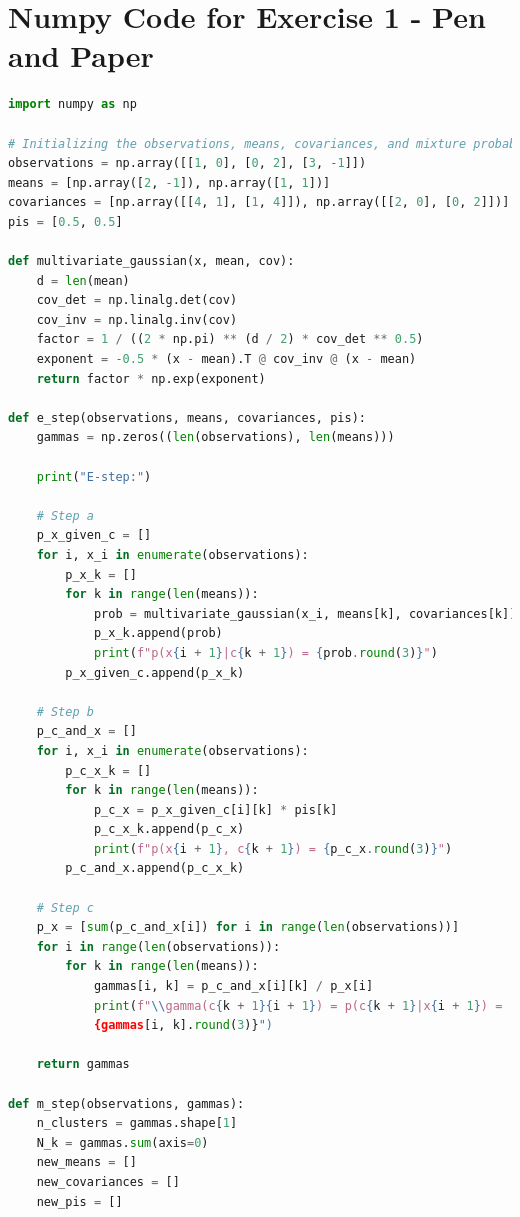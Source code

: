 \documentclass[12pt]{article}
\begin{document}
\section{Numpy Code for Exercise 1 - Pen and Paper}
\begin{lstlisting}[language=Python, caption=Python code for Exercise 1]
import numpy as np

# Initializing the observations, means, covariances, and mixture probabilities
observations = np.array([[1, 0], [0, 2], [3, -1]])
means = [np.array([2, -1]), np.array([1, 1])]
covariances = [np.array([[4, 1], [1, 4]]), np.array([[2, 0], [0, 2]])]
pis = [0.5, 0.5]

def multivariate_gaussian(x, mean, cov):
    d = len(mean)
    cov_det = np.linalg.det(cov)
    cov_inv = np.linalg.inv(cov)
    factor = 1 / ((2 * np.pi) ** (d / 2) * cov_det ** 0.5)
    exponent = -0.5 * (x - mean).T @ cov_inv @ (x - mean)
    return factor * np.exp(exponent)

def e_step(observations, means, covariances, pis):
    gammas = np.zeros((len(observations), len(means)))
    
    print("E-step:")
    
    # Step a
    p_x_given_c = []
    for i, x_i in enumerate(observations):
        p_x_k = []
        for k in range(len(means)):
            prob = multivariate_gaussian(x_i, means[k], covariances[k])
            p_x_k.append(prob)
            print(f"p(x{i + 1}|c{k + 1}) = {prob.round(3)}")
        p_x_given_c.append(p_x_k)
    
    # Step b
    p_c_and_x = []
    for i, x_i in enumerate(observations):
        p_c_x_k = []
        for k in range(len(means)):
            p_c_x = p_x_given_c[i][k] * pis[k]
            p_c_x_k.append(p_c_x)
            print(f"p(x{i + 1}, c{k + 1}) = {p_c_x.round(3)}")
        p_c_and_x.append(p_c_x_k)

    # Step c
    p_x = [sum(p_c_and_x[i]) for i in range(len(observations))]
    for i in range(len(observations)):
        for k in range(len(means)):
            gammas[i, k] = p_c_and_x[i][k] / p_x[i]
            print(f"\\gamma(c{k + 1}{i + 1}) = p(c{k + 1}|x{i + 1}) = 
            {gammas[i, k].round(3)}")
    
    return gammas

def m_step(observations, gammas):
    n_clusters = gammas.shape[1]
    N_k = gammas.sum(axis=0)
    new_means = []
    new_covariances = []
    new_pis = []


\end{lstlisting}
\end{document}
